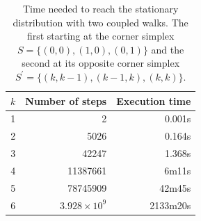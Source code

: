 \documentclass[a4paper]{article}
\begin{document}
\begin{table}[t]
  \centering
  \begin{tabular}{c|r|r}
    $k$ & Number of steps & Execution time\\
    \hline
    \hline
    1 & 2 & 0.001s \\
    2 & 5026 & 0.164s \\
    3 & 42247 & 1.368s \\
    4 & 11387661 & 6m11s \\
    5 & 78745909 & 42m45s \\
    6 & $3.928 \times 10^9$ & 2133m20s \\
    \hline
  \end{tabular}
  \caption{Time needed to reach the stationary distribution with two coupled walks. The first starting at the corner simplex $S=\{(0,0),(1,0),(0,1)\}$ and the second at its opposite corner simplex $S^\prime=\{(k,k-1),(k-1,k),(k,k)\}$.}
  \label{Tab.Coupling}
\end{table}

\end{document}
